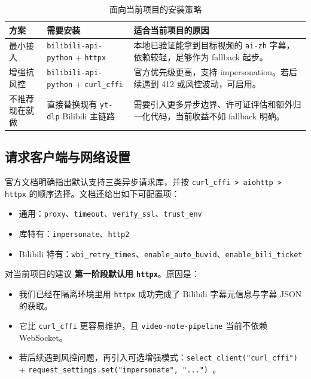 \documentclass[a4paper]{article}
\begin{document}
\begin{table}[H]
\centering
\begin{tabularx}{\textwidth}{p{3.0cm}p{3.1cm}Y}
\toprule
方案 & 需要安装 & 适合当前项目的原因 \\
\midrule
最小接入 & \texttt{bilibili-api-python} + \texttt{httpx} & 本地已验证能拿到目标视频的 \texttt{ai-zh} 字幕，依赖较轻，足够作为 fallback 起步。 \\
增强抗风控 & \texttt{bilibili-api-python} + \texttt{curl\_cffi} & 官方优先级更高，支持 impersonation。若后续遇到 412 或风控波动，可启用。 \\
不推荐现在就做 & 直接替换现有 \texttt{yt-dlp} Bilibili 主链路 & 需要引入更多异步边界、许可证评估和额外归一化代码，当前收益不如 fallback 明确。 \\
\bottomrule
\end{tabularx}
\caption{面向当前项目的安装策略}
\end{table}

\subsection{请求客户端与网络设置}

官方文档明确指出默认支持三类异步请求库，并按 \texttt{curl\_cffi > aiohttp > httpx} 的顺序选择。文档还给出如下可配置项：
\begin{itemize}
\item 通用：\texttt{proxy}、\texttt{timeout}、\texttt{verify\_ssl}、\texttt{trust\_env}
\item 库特有：\texttt{impersonate}、\texttt{http2}
\item Bilibili 特有：\texttt{wbi\_retry\_times}、\texttt{enable\_auto\_buvid}、\texttt{enable\_bili\_ticket}
\end{itemize}

\begin{findingbox}{对当前项目的建议}
\textbf{第一阶段默认用 \texttt{httpx}}。原因是：
\begin{itemize}
\item 我们已经在隔离环境里用 \texttt{httpx} 成功完成了 Bilibili 字幕元信息与字幕 JSON 的获取。
\item 它比 \texttt{curl\_cffi} 更容易维护，且 \texttt{video-note-pipeline} 当前不依赖 WebSocket。
\item 若后续遇到风控问题，再引入可选增强模式：\texttt{select\_client("curl\_cffi")} + \texttt{request\_settings.set("impersonate", "...") }。
\end{itemize}
\end{findingbox}
\end{document}
